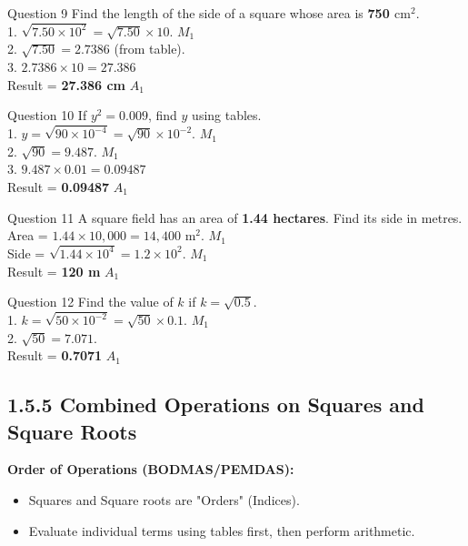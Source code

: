 \documentclass[12pt, a4paper, oneside]{article}
\begin{document}
\begin{solvingbox}{Question 9}
Find the length of the side of a square whose area is \textbf{750 $\text{cm}^2$}. \\
1. $\sqrt{7.50 \times 10^2} = \sqrt{7.50} \times 10$. \hfill $M_1$ \\
2. $\sqrt{7.50} = 2.7386$ (from table). \\
3. $2.7386 \times 10 = 27.386$ \\
Result = \textbf{27.386 cm} \hfill $A_1$
\end{solvingbox}

\begin{solvingbox}{Question 10}
If $y^2 = 0.009$, find $y$ using tables. \\
1. $y = \sqrt{90 \times 10^{-4}} = \sqrt{90} \times 10^{-2}$. \hfill $M_1$ \\
2. $\sqrt{90} = 9.487$. \hfill $M_1$ \\
3. $9.487 \times 0.01 = 0.09487$ \\
Result = \textbf{0.09487} \hfill $A_1$
\end{solvingbox}

\begin{solvingbox}{Question 11}
A square field has an area of \textbf{1.44 hectares}. Find its side in metres. \\
Area = $1.44 \times 10,000 = 14,400\text{ m}^2$. \hfill $M_1$ \\
Side = $\sqrt{1.44 \times 10^4} = 1.2 \times 10^2$. \hfill $M_1$ \\
Result = \textbf{120 m} \hfill $A_1$
\end{solvingbox}

\begin{solvingbox}{Question 12}
Find the value of $k$ if $k = \sqrt{0.5}$. \\
1. $k = \sqrt{50 \times 10^{-2}} = \sqrt{50} \times 0.1$. \hfill $M_1$ \\
2. $\sqrt{50} = 7.071$. \\
Result = \textbf{0.7071} \hfill $A_1$
\end{solvingbox}

\subsection*{1.5.5 Combined Operations on Squares and Square Roots}

\begin{tcolorbox}[colback=lightgrey, colframe=primaryblue, title=\textbf{Concept Summary}, arc=5pt]
    \textbf{Order of Operations (BODMAS/PEMDAS):}
    \begin{itemize}
        \item Squares and Square roots are "Orders" (Indices).
        \item Evaluate individual terms using tables first, then perform arithmetic.
    \end{itemize}
\end{tcolorbox}
\end{document}
